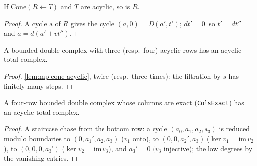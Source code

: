 \begin{lemma}\label{lem:mp-cone-base}
  \leanok
  If $\mathrm{Cone}(R\leftarrow T)$ and $T$ are acyclic, so is $R$.
\end{lemma}
\begin{proof}
  \leanok
  A cycle $a$ of $R$ gives the cycle $(a,0)=D(a',t')$; $dt'=0$, so $t'=dt''$ and $a=d(a'+vt'')$.
\end{proof}

\begin{lemma}\label{lem:mp-assembly-rows}
  \leanok
  A bounded double complex with three (resp.\ four) acyclic rows has an acyclic total complex.
\end{lemma}
\begin{proof}
  \leanok
  \ref{lem:mp-cone-acyclic}, twice (resp.\ three times): the filtration by $s$ has finitely many steps.
\end{proof}

\begin{lemma}\label{lem:mp-assembly-cols}
  \leanok
  A four-row bounded double complex whose columns are exact (\texttt{ColsExact}) has an acyclic total complex.
\end{lemma}
\begin{proof}
  \leanok
  A staircase chase from the bottom row: a cycle $(a_0,a_1,a_2,a_3)$ is reduced modulo boundaries to $(0,a_1',a_2,a_3)$ ($v_1$ onto),
  to $(0,0,a_2',a_3)$ ($\ker v_1=\mathrm{im}\,v_2$), to $(0,0,0,a_3')$ ($\ker v_2=\mathrm{im}\,v_3$), and $a_3'=0$ ($v_3$ injective); the
  low degrees by the vanishing entries.
\end{proof}

